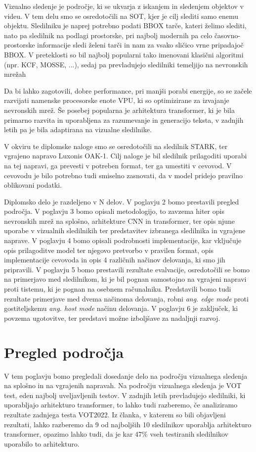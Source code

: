 \documentclass[a4paper,12pt,openright]{book}
\begin{document}
Vizualno sledenje je področje, ki se ukvarja z iskanjem in sledenjem objektov v videu. V tem delu smo se osredotočili na SOT, kjer je cilj slediti samo enemu objektu. Sledilniku je naprej potrebno podati BBOX tarče, kateri želimo slediti, nato pa sledilnik na podlagi prostorske, pri najbolj modernih pa celo časovno-prostorske informacije sledi želeni tarči in nam za vsako sličico vrne pripadajoč BBOX. V preteklosti so bil najbolj popularni tako imenovani klasični algoritmi (npr. KCF, MOSSE, ...), sedaj pa prevladujejo sledilniki temeljijo na nevronskih mrežah

Da bi lahko zagotovili, dobre performance, pri manjši porabi energije, so se začele razvijati namenske procesorske enote VPU, ki so optimizirane za izvajanje nevronskih mrež. Še posebej popularna je arhitektura transformer, ki je bila primarno razvita in uporabljena za razumevanje in generacijo teksta, v zadnjih letih pa je bila adaptirana na vizualne sledilnike.

V okviru te diplomske naloge smo se osredotočili na sledilnik STARK, ter vgrajeno napravo Luxonis OAK-1. Cilj naloge je bil sledilnik prilagoditi uporabi na tej napravi, ga prevesti v potreben format, ter ga umestiti v cevovod. V cevovodu je bilo potrebno tudi smiselno zasnovati, da v model pridejo pravilno oblikovani podatki.

Diplomsko delo je razdeljeno v N delov. V poglavju 2 bomo prestavili pregled področja. V poglavju 3 bomo opisali metodologijo, to zavzema hiter opis nevronskih mrež na splošno, arhitekture CNN in transformer, ter opis njune uporabe v vizualnih sledilnikih ter predstavitev izbranega sledilnika in vgrajene naprave. V poglavju 4 bomo opisali podrobnosti implementacije, kar vključuje opis prilagoditve model ter njegovo pretvorbo v pravilen format, opis implementacije cevovoda in opis 4 različnih načinov delovanja, ki smo jih pripravili. V poglavju 5 bomo prestavili rezultate evalvacije, osredotočili se bomo na primerjavo med sledilnikom, ki je bil pognan samostojno na vgrajeni napravi proti tistemu, ki je pognan na osebnem računalniku. Predstavili bomo tudi rezultate primerjave med dvema načinoma delovanja, robni \emph{ang. edge mode} proti gostiteljskemu \emph{ang. host mode} načinu delovanja. V poglavju 6 je zaključek, ki povzema ugotovitve, ter predstavi možne izboljšave za nadaljnji razvoj.

\chapter{Pregled področja}
\label{ch0}
V tem poglavju bomo pregledali dosedanje delo na področju vizualnega sledenja na splošno in na vgrajenih napravah. Na področju vizualnega sledenja je VOT test, eden najbolj uveljavljenih testov. V zadnjih letih prevladujejo sledilniki, ki uporabljajo arhitekturo transformer, to lahko tudi razberemo, če analiziramo rezultate zadnjega testa VOT2022. Iz članka, v katerem so bili objavljeni rezultati, lahko razberemo da 9 od najboljših 10 sledilnikov uporablja arhitekturo transformer, opazimo lahko tudi, da je kar 47\% vseh testiranih sledilnikov uporabilo to arhitekturo.
\end{document}
